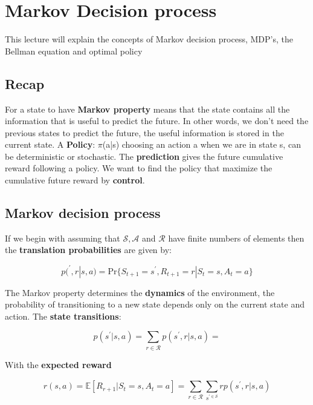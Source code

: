 \section{Markov Decision process}
This lecture will explain the concepts of Markov decision process, MDP's, the Bellman equation and optimal policy

\subsection*{Recap}
For a state to have \textbf{Markov property} means that the state contains all the information that is useful to predict the future. In other words, we don't need the previous states to predict the future, the useful information is stored in the current state. A \textbf{Policy}: $\pi$(a|s) choosing an action a when we are in state s, can be deterministic or stochastic. The \textbf{prediction} gives the future cumulative reward following a policy. We want to find the policy that maximize the cumulative future reward by \textbf{control}. 

\subsection*{Markov decision process}
If we begin with assuming that $\mathcal{S}, \mathcal{A} $ and $\mathcal{R}$ have finite numbers of elements then the \textbf{translation probabilities} are given by:

	\begin{equation}
		p(^{\prime},r |s,a) = \text{Pr}\{S_{t+1} = s^{\prime}, R_{t+1} = r | S_t = s, A_t = a \}
	\end{equation}

The Markov property determines the \textbf{dynamics} of the environment, the probability of transitioning to a new state depends only on the current state and action. The \textbf{state transitions}:

	\begin{equation}
		p(s^{\prime} | s,a) = \sum_{r \in \mathcal{R}} p(s^{\prime},r |s,a) =
	\end{equation}

With the \textbf{expected reward }

	\begin{equation}
		r(s,a) = \mathbb{E} [ R_{r+1} | S_t = s, A_t = a ] =  \sum_{r \in \mathcal{R}}^{} \sum_{s^{\prime \in \mathcal{S}}}^{} r p(s^{\prime},r | s,a)  
	\end{equation}

